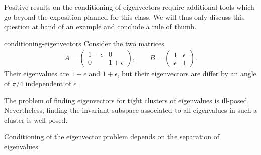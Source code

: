 \begin{intro}
  Positive results on the conditioning of eigenvectors require
  additional tools which go beyond the exposition planned for this
  class. We will thus only discuss this question at hand of an example
  and conclude a rule of thumb.
\end{intro}

\begin{Example}{conditioning-eigenvectors}
  Consider the two matrices
  \begin{gather}
    A =
    \begin{pmatrix}
      1-\epsilon & 0\\ 0 & 1+\epsilon
    \end{pmatrix},
    \qquad
    B =
    \begin{pmatrix}
      1&\epsilon\\\epsilon&1
    \end{pmatrix}.
  \end{gather}
  Their eigenvalues are $1-\epsilon$ and $1+\epsilon$, but their
  eigenvectors are differ by an angle of $\pi/4$ independent of
  $\epsilon$.
\end{Example}

\begin{Remark}
  The problem of finding eigenvectors for tight clusters of
  eigenvalues is ill-posed. Nevertheless, finding the invariant
  subspace associated to all eigenvalues in such a cluster is
  well-posed.

  Conditioning of the eigenvector problem depends on the separation of
  eigenvalues.
\end{Remark}

